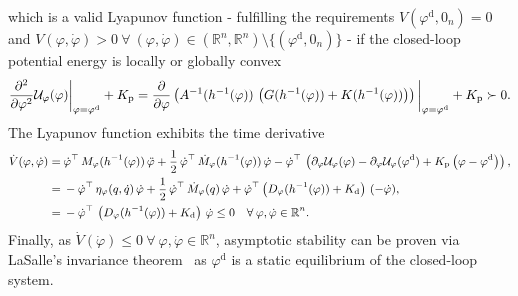 which is a valid Lyapunov function - fulfilling the requirements $V(\varphi^\mathrm{d},0_n) = 0$ and $V(\varphi,\dot{\varphi}) > 0 \: \forall \: (\varphi, \dot{\varphi}) \in (\mathbb{R}^n, \mathbb{R}^n) \setminus \{ (\varphi^\mathrm{d}, 0_n) \}$ - if the closed-loop potential energy is locally or globally convex
\begin{equation}\small
    \frac{\partial^2}{\partial \varphi^2} \mathcal{U}_{\varphi}(\varphi) \bigg |_\mathrm{\varphi = \varphi^\mathrm{d}} + K_\mathrm{p} = \frac{\partial}{\partial \varphi} \left (  A^{-1}(h^{-1}(\varphi)) \,  \left ( G(h^{-1}(\varphi)) + K(h^{-1}(\varphi)) \right ) \right ) \bigg |_\mathrm{\varphi = \varphi^\mathrm{d}} + K_\mathrm{p} \succ 0.
\end{equation}
The Lyapunov function exhibits the time derivative~\citep{della2023model}
\begin{equation}\small
\begin{split}
    \dot{V}(\varphi,\dot{\varphi}) 
    =& \: \dot{\varphi}^\top \, M_\varphi(h^{-1}(\varphi)) \, \ddot{\varphi} + \frac{1}{2} \, \dot{\varphi}^\top \, \dot{M}_\varphi(h^{-1}(\varphi)) \, \dot{\varphi} - \dot{\varphi}^\top \, \left ( \partial_{\varphi} \mathcal{U}_\varphi(\varphi) - \partial_{\varphi} \mathcal{U}_\varphi(\varphi^\mathrm{d}) + K_\mathrm{p} \left ( \varphi - \varphi^\mathrm{d} \right ) \right ),\\
    =& \: -\dot{\varphi}^\top \, \eta_\varphi(q,\dot{q}) \, \dot{\varphi} + \frac{1}{2} \, \dot{\varphi}^\top \, \dot{M}_\varphi(q) \, \dot{\varphi} + \dot{\varphi}^\top \left ( D_\varphi(h^{-1}(\varphi)) + K_\mathrm{d} \right ) \, (-\dot{\varphi}),\\
    =& \: -\dot{\varphi}^\top \, \left ( D_\varphi(h^{-1}(\varphi)) + K_\mathrm{d} \right ) \, \dot{\varphi} \leq 0 \quad \forall \: \varphi,\dot{\varphi} \in \mathbb{R}^n.
\end{split}
\end{equation}
Finally, as $\dot{V}(\dot{\varphi}) \leq 0 \: \forall \: \varphi,\dot{\varphi}\in \mathbb{R}^n$, asymptotic stability can be proven via LaSalle's invariance theorem~\citep{khalil2002nonlinear} as $\varphi^\mathrm{d}$ is a static equilibrium of the closed-loop system.

